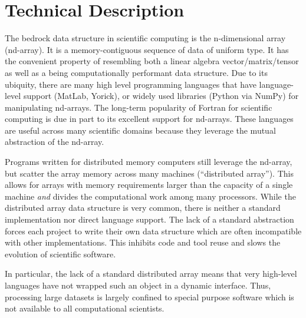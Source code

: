 \documentclass[letterpaper,12pt]{article}
\begin{document}

\section*{Technical Description}

The bedrock data structure in scientific computing is the n-dimensional array (nd-array).  
It is a memory-contiguous sequence of data of uniform type.  It has the convenient property 
of resembling both a linear algebra vector/matrix/tensor as well as a being computationally 
performant data structure.  Due to its ubiquity, there are many high level programming 
languages that have language-level support (MatLab\cite{matlab}, Yorick\cite{Munro1995}), 
or widely used libraries (Python\cite{CPython} via NumPy\cite{Oliphant2006}) for 
manipulating nd-arrays.  The long-term popularity of Fortran for scientific computing is 
due in part to its excellent support for nd-arrays.  These languages are useful across 
many scientific domains because they leverage the mutual abstraction of the nd-array.

Programs written for distributed memory computers still leverage the nd-array, but scatter 
the array memory across many machines (``distributed array'').  This allows for arrays 
with memory requirements larger than the capacity of a single machine \emph{and} divides 
the computational work among many processors.  While the distributed array data structure 
is very common, there is neither a standard implementation nor direct language support.  
The lack of a standard abstraction forces each project to write their own data structure 
which are often incompatible with other implementations.  This inhibits code and tool 
reuse and slows the evolution of scientific software.

In particular, the lack of a standard distributed array means that very high-level 
languages have not wrapped such an object in a dynamic interface.  Thus, processing large 
datasets is largely confined to special purpose software which is not available to all 
computational scientists.
\end{document}
